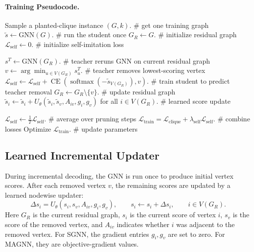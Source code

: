 \paragraph{Training Pseudocode.}
\begin{algorithmic}[1]
  \State Sample a planted-clique instance $(G,k)$. \# get one training graph
  \State $\tilde{s} \leftarrow \mathrm{GNN}(G)$. \# run the student once
  \State $G_R \leftarrow G$. \# initialize residual graph
  \State $\mathcal{L}_{\mathrm{self}}\leftarrow 0$. \# initialize self-imitation loss

  \State $s^T \leftarrow \mathrm{GNN}(G_R)$. \# teacher reruns GNN on current residual graph
  \State $v \leftarrow \arg\min_{u\in V(G_R)} s^T_u$. \# teacher removes lowest-scoring vertex
  \State $\mathcal{L}_{\mathrm{self}} \leftarrow \mathcal{L}_{\mathrm{self}} + \operatorname{CE}\!\left(\operatorname{softmax}(-\tilde{s}_{V(G_R)}),v\right)$. \# train student to predict teacher removal
  \State $G_R \leftarrow G_R \setminus \{v\}$. \# update residual graph
  \State $\tilde{s}_i \leftarrow \tilde{s}_i + U_\theta\!\left(\tilde{s}_i,\tilde{s}_v,A_{iv},g_i,g_v\right)$ for all $i\in V(G_R)$. \# learned score update
  \EndFor

  \State $\mathcal{L}_{\mathrm{self}} \leftarrow \frac{1}{T}\mathcal{L}_{\mathrm{self}}$. \# average over pruning steps
  \State $\mathcal{L}_{\mathrm{train}} = \mathcal{L}_{\mathrm{clique}} + \lambda_{\mathrm{self}}\mathcal{L}_{\mathrm{self}}$. \# combine losses
  \State Optimize $\mathcal{L}_{\mathrm{train}}$. \# update parameters
\end{algorithmic}

\subsection{Learned Incremental Updater}

During incremental decoding, the GNN is run once to produce initial vertex scores. After each removed vertex $v$, the remaining scores are updated by a learned nodewise updater:
\[
  \Delta s_i
  =
  U_\theta\!\left(s_i,s_v,A_{iv},g_i,g_v\right),
  \qquad
  s_i \leftarrow s_i + \Delta s_i ,
  \qquad i\in V(G_R).
\]
Here $G_R$ is the current residual graph, $s_i$ is the current score of vertex $i$, $s_v$ is the score of the removed vertex, and $A_{iv}$ indicates whether $i$ was adjacent to the removed vertex. For SGNN, the gradient entries $g_i,g_v$ are set to zero. For MAGNN, they are objective-gradient values.

